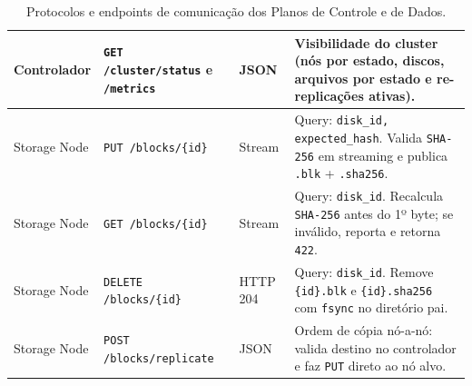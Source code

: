 \documentclass[10pt,a4paper]{article}
\begin{document}
\begin{table}[!htbp]
\begin{tabularx}{\textwidth}{l l l Y}
Controlador & \texttt{GET /cluster/status} e \texttt{/metrics} & JSON & Visibilidade do cluster (nós por estado, discos, arquivos por estado e re-replicações ativas). \\
\midrule
Storage Node & \texttt{PUT /blocks/\{id\}} & Stream &Query: \texttt{disk\_id, expected\_hash}. Valida \texttt{SHA-256} em streaming e publica \texttt{.blk} + \texttt{.sha256}. \\
Storage Node & \texttt{GET /blocks/\{id\}} & Stream &Query: \texttt{disk\_id}. Recalcula \texttt{SHA-256} antes do 1º byte; se inválido, reporta e retorna \texttt{422}. \\
Storage Node & \texttt{DELETE /blocks/\{id\}} & HTTP 204 &Query: \texttt{disk\_id}. Remove \texttt{\{id\}.blk} e \texttt{\{id\}.sha256} com \texttt{fsync} no diretório pai. \\
Storage Node & \texttt{POST /blocks/replicate} & JSON & Ordem de cópia nó-a-nó: valida destino no controlador e faz \texttt{PUT} direto ao nó alvo. \\
\bottomrule
\end{tabularx}
\caption{Protocolos e endpoints de comunicação dos Planos de Controle e de Dados.}
\label{tab:api}
\end{table}
\end{document}
